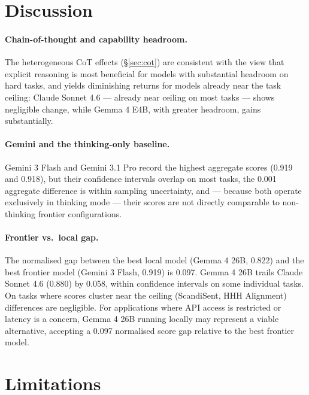 \documentclass[11pt]{article}
\begin{document}
\section{Discussion}

\paragraph{Chain-of-thought and capability headroom.}
The heterogeneous CoT effects (\S\ref{sec:cot}) are consistent with the view
that explicit reasoning is most beneficial for models with substantial headroom
on hard tasks, and yields diminishing returns for models already near the task
ceiling: Claude Sonnet 4.6 — already near ceiling on most tasks — shows
negligible change, while Gemma 4 E4B, with greater headroom, gains substantially.

\paragraph{Gemini and the thinking-only baseline.}
Gemini 3 Flash and Gemini 3.1 Pro record the highest aggregate
scores (0.919 and 0.918), but their confidence intervals overlap on most tasks,
the 0.001 aggregate difference is within sampling uncertainty, and — because
both operate exclusively in thinking mode — their scores are not directly
comparable to non-thinking frontier configurations.

\paragraph{Frontier vs.\ local gap.}
The normalised gap between the best local model (Gemma 4 26B, 0.822)
and the best frontier model (Gemini 3 Flash, 0.919) is 0.097.
Gemma 4 26B trails Claude Sonnet 4.6 (0.880) by 0.058, within
confidence intervals on some individual tasks.
On tasks where scores cluster near the ceiling (ScandiSent, HHH Alignment)
differences are negligible.
For applications where API access is restricted or latency is a concern,
Gemma 4 26B running locally may represent a viable alternative,
accepting a 0.097 normalised score gap relative to the best frontier model.

\section{Limitations}
\label{sec:limitations}
\end{document}
